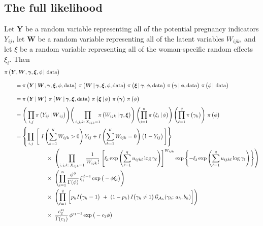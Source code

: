 \documentclass[11pt]{article}
\renewcommand{\vec}{\boldsymbol}
\newcommand{\barS}{\,|\,}
\newcommand{\ind}{I}
\begin{document}

\subsection{The full likelihood}

Let $\vec{Y}$ be a random variable representing all of the potential pregnancy indicators $Y_{ij}$, let $\vec{W}$ be a random variable representing all of the latent variables $W_{ijk}$, and let $\xi$ be a random variable representing all of the woman-specific random effects $\xi_i$.  Then
\begin{align*} \MoveEqLeft
\pi\,\big( \vec{Y}, \vec{W}, \vec{\gamma}, \vec{\xi}, \phi \barS\, \text{data} \big) \\[2ex]
&= \pi\,\big( \vec{Y} \barS \vec{W}, \vec{\gamma}, \vec{\xi}, \phi, \text{data} \big)~ \pi\,\big( \vec{W} \barS \vec{\gamma}, \vec{\xi}, \phi, \text{data} \big)~ \pi\,\big( \vec{\xi} \barS \vec{\gamma}, \phi, \text{data} \big)~ \pi\,\big( \vec{\gamma} \barS \phi, \text{data} \big)~ \pi\,\big( \phi \barS\, \text{data} \big) \\[2ex]
&= \pi\,\big( \vec{Y} \barS \vec{W} \big)~ \pi\,\big( \vec{W} \barS \vec{\gamma}, \vec{\xi}, \text{data} \big)~ \pi\,\big( \vec{\xi} \barS \phi \big)~ \pi\,\big( \vec{\gamma} \big)~ \pi\,\big( \phi \big) \\[1ex]
&= \Bigg( \prod_{i,j} \pi\,\big( Y_{ij} \barS \vec{W}_{ij} \big) \Bigg) \Bigg( \prod_{i,j,k{:}\, X_{ijk}=1} \hspace{-2mm} \pi\,\big( W_{ijk} \barS \vec{\gamma}, \vec{\xi} \big) \Bigg) \left( \prod_{i=1}^n \pi\,\big( \xi_i \barS \phi \big) \right)\left( \prod_{\ell=1}^q \pi\,\big(\gamma_h\big) \right)\, \pi\,\big( \phi \big) \\
&= \left\{ \prod_{i,j}\, \left[~ \ind\left( \sum_{k=1}^K W_{ijk} > 0 \right) Y_{ij} + \ind\left( \sum_{k=1}^K W_{ijk} = 0 \right) \big(1 - Y_{ij}\big)\,  \right] \right\} \\
& \hspace{20mm} \times~ \left( \prod_{i,j,k{:}\, X_{ijk}=1} \hspace{0mm} \frac{ 1 }{ W_{ijk}! }\, \left[ \xi_i \exp\left( \sum_{\ell=1}^q u_{ijk\ell} \log \gamma_\ell \right) \right]^{W_{ijk}} \exp\left\{ -\xi_i \exp\left( \sum_{\ell=1}^q u_{ijk\ell} \log \gamma_\ell \right) \right\}  \right) \\
& \hspace{20mm} \times~ \left( \prod_{i=1}^n \frac{ \phi^\phi }{ \Gamma(\phi) }\, \xi_i^{\phi-1} \exp\big( -\phi \xi_i \big) \right) \\
& \hspace{20mm} \times~ \left( \prod_{\ell=1}^q\, \bigg[ p_h \ind\big( \gamma_h = 1 \big) ~+~ (1 - p_h)\, \ind\big( \gamma_h \ne 1 \big)\, \mathcal{G}_{\mathcal{A}_h} (\gamma_h;\, a_h,b_h) \bigg] \right) \\[0.5ex]
& \hspace{20mm} \times~ \frac{ c_2^{c_1} }{ \Gamma(c_1) }\, \phi^{c_1-1} \exp\big( -c_2 \phi \big)
\end{align*}
\end{document}
